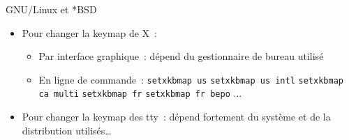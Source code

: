 \begin{frame}{GNU/Linux et *BSD}
    \begin{itemize}
        \item Pour changer la keymap de X~: \pause
            \begin{itemize}
                \item Par interface graphique~: dépend du gestionnaire de
                  bureau utilisé \pause

                \item En ligne de commande~:
                  \newline \texttt{setxkbmap us}
                  \newline \texttt{setxkbmap us intl}
                  \newline \texttt{setxkbmap ca multi}
                  \newline \texttt{setxkbmap fr}
                  \newline \texttt{setxkbmap fr bepo}
                  ...
            \end{itemize}
            \pause

        \item Pour changer la keymap des tty~: dépend fortement du système et
          de la distribution utilisés…\pause
    \end{itemize}
\end{frame}

